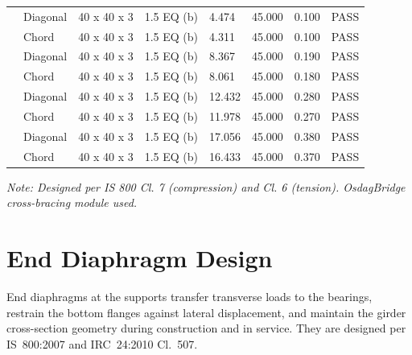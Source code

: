 \documentclass[12pt,a4paper]{report}
\numberwithin{table}{chapter}
\numberwithin{figure}{chapter}
\newcommand{\ReportTablePaddingCompact}{4pt}
\newcommand{\ReportTableRowGap}{6pt}
\begin{document}
\begin{longtable}{|C{2.0cm}|L{1.8cm}|C{2.2cm}|C{3.0cm}|C{1.8cm}|C{1.8cm}|C{1.2cm}|C{1.8cm}|}
\hline
{} & Diagonal & 40 x 40 x 3 & 1.5 EQ (b) & 4.474 & 45.000 & 0.100 & \textcolor{reportBlack}{PASS} \\[\ReportTableRowGap]
 & Chord & 40 x 40 x 3 & 1.5 EQ (b) & 4.311 & 45.000 & 0.100 & \textcolor{reportBlack}{PASS} \\[\ReportTableRowGap]
\hline
{} & Diagonal & 40 x 40 x 3 & 1.5 EQ (b) & 8.367 & 45.000 & 0.190 & \textcolor{reportBlack}{PASS} \\[\ReportTableRowGap]
 & Chord & 40 x 40 x 3 & 1.5 EQ (b) & 8.061 & 45.000 & 0.180 & \textcolor{reportBlack}{PASS} \\[\ReportTableRowGap]
\hline
{} & Diagonal & 40 x 40 x 3 & 1.5 EQ (b) & 12.432 & 45.000 & 0.280 & \textcolor{reportBlack}{PASS} \\[\ReportTableRowGap]
 & Chord & 40 x 40 x 3 & 1.5 EQ (b) & 11.978 & 45.000 & 0.270 & \textcolor{reportBlack}{PASS} \\[\ReportTableRowGap]
\hline
{} & Diagonal & 40 x 40 x 3 & 1.5 EQ (b) & 17.056 & 45.000 & 0.380 & \textcolor{reportBlack}{PASS} \\[\ReportTableRowGap]
 & Chord & 40 x 40 x 3 & 1.5 EQ (b) & 16.433 & 45.000 & 0.370 & \textcolor{reportBlack}{PASS} \\[\ReportTableRowGap]
\hline
\end{longtable}
\noindent\textit{Note: Designed per IS 800 Cl. 7 (compression) and Cl. 6 (tension). OsdagBridge cross-bracing module used.}

\section{End Diaphragm Design}
\label{sec:end-diaphragm}

End diaphragms at the supports transfer transverse loads to the bearings, restrain the bottom flanges against lateral displacement, and maintain the girder cross-section geometry during construction and in service. They are designed per IS~800:2007 and IRC~24:2010 Cl.~507.

\vspace{1em}

\vspace{0.4em}
\noindent
\setlength{\tabcolsep}{\ReportTablePaddingCompact}
\setlength{\LTleft}{0pt}
\setlength{\LTright}{\fill}
\end{document}
